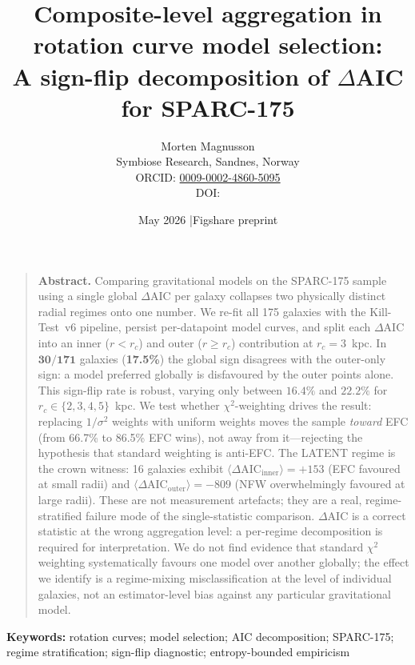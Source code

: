 \documentclass[11pt,a4paper]{article}
\title{\textbf{Composite-level aggregation in rotation curve model selection:\\
A sign-flip decomposition of $\Delta$AIC for SPARC-175}}
\author{
  Morten Magnusson\\
  \small Symbiose Research, Sandnes, Norway\\
  \small ORCID: \href{https://orcid.org/0009-0002-4860-5095}{0009-0002-4860-5095}\\
  \small DOI: \href{https://doi.org/\PaperDOI}{\PaperDOI}
}
\date{May 2026 \quad|\quad Figshare preprint}
\begin{document}
\maketitle
\thispagestyle{fancy}


\begin{quote}
\textbf{Abstract.}
Comparing gravitational models on the SPARC-175 sample using a single
global $\Delta$AIC per galaxy collapses two physically distinct radial
regimes onto one number.  We re-fit all 175 galaxies with the Kill-Test~v6
pipeline, persist per-datapoint model curves, and split each $\Delta$AIC
into an inner ($r<r_c$) and outer ($r\ge r_c$) contribution at
$r_c=3$~kpc.  In $\mathbf{30/171}$ galaxies (\textbf{17.5\%}) the global
sign disagrees with the outer-only sign: a model preferred globally is
disfavoured by the outer points alone.  This sign-flip rate is robust,
varying only between $\mathbf{16.4\%}$ and $\mathbf{22.2\%}$ for
$r_c\in\{2,3,4,5\}$~kpc.  We test whether $\chi^2$-weighting drives the
result: replacing $1/\sigma^2$ weights with uniform weights moves the
sample {\em toward} EFC (from 66.7\% to 86.5\% EFC wins), not away from
it---rejecting the hypothesis that standard weighting is anti-EFC.  The
LATENT regime is the crown witness: 16 galaxies exhibit
$\langle\Delta\text{AIC}_{\text{inner}}\rangle = +153$ (EFC favoured at
small radii) and $\langle\Delta\text{AIC}_{\text{outer}}\rangle = -809$
(NFW overwhelmingly favoured at large radii).  These are not measurement
artefacts; they are a real, regime-stratified failure mode of the
single-statistic comparison.  $\Delta$AIC is a correct statistic at the
wrong aggregation level: a per-regime decomposition is required for
interpretation.  We do not find evidence that standard $\chi^2$ weighting
systematically favours one model over another globally; the effect we
identify is a regime-mixing misclassification at the level of individual
galaxies, not an estimator-level bias against any particular gravitational
model.
\end{quote}

\vspace{4pt}
\noindent\textbf{Keywords:} rotation curves; model selection; AIC decomposition;
SPARC-175; regime stratification; sign-flip diagnostic;
entropy-bounded empiricism
\end{document}
